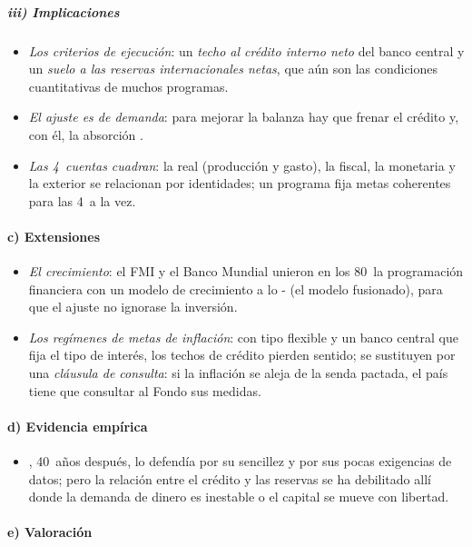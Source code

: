\documentclass[11pt]{article}
\begin{document}
\subparagraph{iii) Implicaciones}

\begin{itemize}
\item \emph{Los criterios de ejecución}: un \emph{techo al crédito interno neto} del banco central y un \emph{suelo a las reservas internacionales netas}, que aún son las condiciones cuantitativas de muchos programas.
\item \emph{El ajuste es de demanda}: para mejorar la balanza hay que frenar el crédito y, con él, la absorción .
\item \emph{Las 4~cuentas cuadran}: la real (producción y gasto), la fiscal, la monetaria y la exterior se relacionan por identidades; un programa fija metas coherentes para las 4~a la vez.
\end{itemize}

\paragraph{c) Extensiones}

\begin{itemize}
\item \emph{El crecimiento}: el FMI y el Banco Mundial unieron en los 80~la programación financiera con un modelo de crecimiento a lo - (el modelo fusionado), para que el ajuste no ignorase la inversión\nocite{KhanMontielHaque1990}.
\item \emph{Los regímenes de metas de inflación}: con tipo flexible y un banco central que fija el tipo de interés, los techos de crédito pierden sentido; se sustituyen por una \emph{cláusula de consulta}: si la inflación se aleja de la senda pactada, el país tiene que consultar al Fondo sus medidas.
\end{itemize}

\paragraph{d) Evidencia empírica}

\begin{itemize}
\item \textcite{Polak1998}, 40~años después, lo defendía por su sencillez y por sus pocas exigencias de datos; pero la relación entre el crédito y las reservas se ha debilitado allí donde la demanda de dinero es inestable o el capital se mueve con libertad.
\end{itemize}

\paragraph{e) Valoración}
\end{document}
